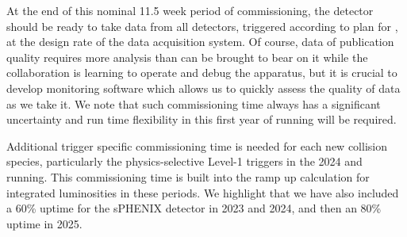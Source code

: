 At the end of this nominal 11.5 week period of commissioning, the detector should be ready to take data from all detectors, triggered
according to plan for \auau, at the design rate of the data acquisition system.
Of course, data of publication quality requires more analysis than can be brought to bear 
on it while the collaboration is learning to operate and debug the apparatus, but it is
crucial to develop monitoring software which allows us to quickly assess the quality of
data as we take it.  We note that such commissioning time always has a significant uncertainty and run time 
flexibility in this first year of running will be required.

Additional trigger specific commissioning time is needed for each new collision species, particularly the physics-selective Level-1 triggers in the 2024 \pp and \pau running.   This commissioning time is built into the ramp up calculation for integrated luminosities in these periods.
We highlight that we have also included a 60\% uptime for the sPHENIX detector in 2023 and 2024, and then an 80\% uptime in 2025.
